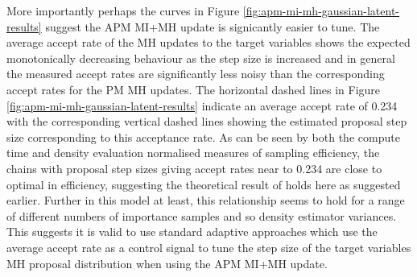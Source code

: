More importantly perhaps the curves in Figure \ref{fig:apm-mi-mh-gaussian-latent-results} suggest the \ac{APM} \ac{MI}+\ac{MH} update is signicantly easier to tune. The average accept rate of the \ac{MH} updates to the target variables shows the expected monotonically decreasing behaviour as the step size is increased and in general the measured accept rates are significantly less noisy than the corresponding accept rates for the \ac{PM} \ac{MH} updates. The horizontal dashed lines in Figure \ref{fig:apm-mi-mh-gaussian-latent-results} indicate an average accept rate of 0.234 with the corresponding vertical dashed lines showing the estimated proposal step size corresponding to this acceptance rate. As can be seen by both the compute time and density evaluation normalised measures of sampling efficiency, the chains with proposal step sizes giving accept rates near to 0.234 are close to optimal in efficiency, suggesting the theoretical result of \citep{gelman1997weak} holds here as suggested earlier. Further in this model at least, this relationship seems to hold for a range of different numbers of importance samples and so density estimator variances. This suggests it is valid to use standard adaptive approaches which use the average accept rate as a control signal to tune the step size of the target variables \ac{MH} proposal distribution when using the \ac{APM} \ac{MI}+\ac{MH} update.

